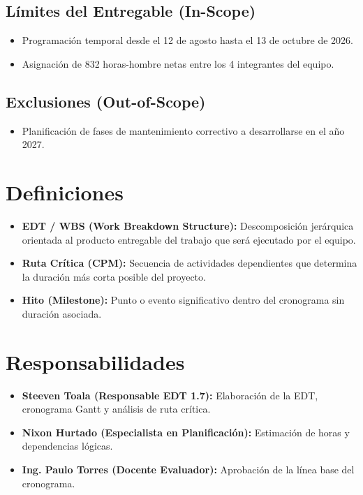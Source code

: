 \documentclass[12pt,a4paper]{article}
\begin{document}
\subsection{Límites del Entregable (In-Scope)}
\begin{itemize}[leftmargin=1.5em, itemsep=2pt]
    \item Programación temporal desde el 12 de agosto hasta el 13 de octubre de 2026.
    \item Asignación de 832 horas-hombre netas entre los 4 integrantes del equipo.
\end{itemize}
\subsection{Exclusiones (Out-of-Scope)}
\begin{itemize}[leftmargin=1.5em, itemsep=2pt]
    \item Planificación de fases de mantenimiento correctivo a desarrollarse en el año 2027.
\end{itemize}

\section{Definiciones}
\begin{itemize}[leftmargin=1.5em, itemsep=2pt]
    \item \textbf{EDT / WBS (Work Breakdown Structure):} Descomposición jerárquica orientada al producto entregable del trabajo que será ejecutado por el equipo.
    \item \textbf{Ruta Crítica (CPM):} Secuencia de actividades dependientes que determina la duración más corta posible del proyecto.
    \item \textbf{Hito (Milestone):} Punto o evento significativo dentro del cronograma sin duración asociada.
\end{itemize}

\section{Responsabilidades}
\begin{itemize}[leftmargin=1.5em, itemsep=2pt]
    \item \textbf{Steeven Toala (Responsable EDT 1.7):} Elaboración de la EDT, cronograma Gantt y análisis de ruta crítica.
    \item \textbf{Nixon Hurtado (Especialista en Planificación):} Estimación de horas y dependencias lógicas.
    \item \textbf{Ing. Paulo Torres (Docente Evaluador):} Aprobación de la línea base del cronograma.
\end{itemize}
\end{document}
